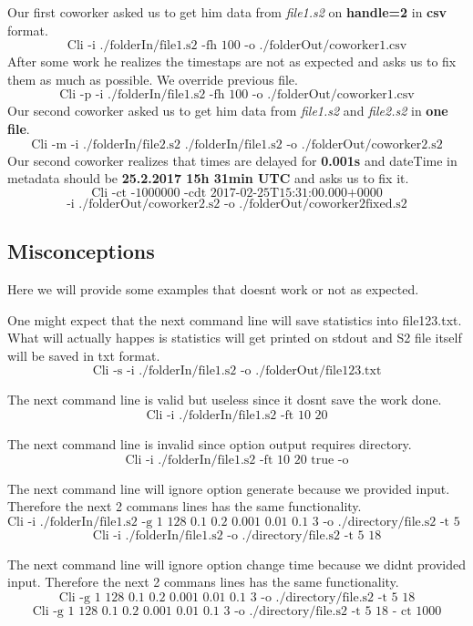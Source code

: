 \documentclass[english]{article}
\begin{document}

Our first coworker asked us to get him data from \textit{file1.s2} on \textbf{handle=2} in \textbf{csv} format.
$$\text{Cli -i ./folderIn/file1.s2  -fh 100 -o ./folderOut/coworker1.csv}$$
After some work he realizes the timestaps are not as expected and asks us to fix them as much as possible. We override previous file.
$$\text{Cli -p -i ./folderIn/file1.s2 -fh 100 -o ./folderOut/coworker1.csv}$$
Our second coworker asked us to get him data from \textit{file1.s2} and \textit{file2.s2} in \textbf{one file}.
$$\text{Cli -m -i ./folderIn/file2.s2 ./folderIn/file1.s2 -o ./folderOut/coworker2.s2}$$
Our second coworker realizes that times are delayed for \textbf{0.001s} and dateTime in metadata should be \textbf{25.2.2017 15h 31min UTC} and asks us to fix it.
$$\text{Cli -ct -1000000 -cdt 2017-02-25T15:31:00.000+0000}$$ $$ \text{-i ./folderOut/coworker2.s2 -o ./folderOut/coworker2fixed.s2}$$



\subsection{Misconceptions}
Here we will provide some examples that doesnt work or not as expected.

One might expect that the next command line will save statistics into file123.txt. What will actually happes is statistics will get printed on stdout and S2 file itself will be saved in txt format.
$$\text{Cli -s -i ./folderIn/file1.s2 -o ./folderOut/file123.txt}$$

The next command line is valid but useless since it dosnt save the work done.
$$\text{Cli -i ./folderIn/file1.s2 -ft 10 20}$$

The next command line is invalid since option output requires directory.
$$\text{Cli -i ./folderIn/file1.s2 -ft 10 20 true -o}$$

The next command line will ignore option generate because we provided input. Therefore the next 2 commans lines has the same functionality.
$$\text{Cli -i ./folderIn/file1.s2 -g 1 128 0.1 0.2 0.001 0.01 0.1 3 -o ./directory/file.s2 -t 5 18}$$
$$\text{Cli -i ./folderIn/file1.s2 -o ./directory/file.s2 -t 5 18}$$

The next command line will ignore option change time because we didnt provided input. Therefore the next 2 commans lines has the same functionality.
$$\text{Cli -g 1 128 0.1 0.2 0.001 0.01 0.1 3 -o ./directory/file.s2 -t 5 18}$$
$$\text{Cli -g 1 128 0.1 0.2 0.001 0.01 0.1 3 -o ./directory/file.s2 -t 5 18 - ct 1000}$$
\end{document}
